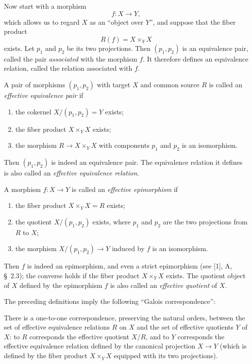 Now start with a morphism
\[
  f:X\longrightarrow Y,
\]
which allows us to regard $X$ as an ``object over $Y$'', and suppose that the
fiber product
\[
  R(f)=X\times_Y X
\]
exists. Let $p_1$ and $p_2$ be its two projections. Then $(p_1,p_2)$ is an
equivalence pair, called the pair \emph{associated} with the morphism $f$. It
therefore defines an equivalence relation, called the relation associated with
$f$.

A pair of morphisms $(p_1,p_2)$ with target $X$ and common source $R$ is
called an \emph{effective equivalence pair} if
\begin{enumerate}
  \item[(i)] the cokernel $X/(p_1,p_2)=Y$ exists;
  \item[(ii)] the fiber product $X\times_Y X$ exists;
  \item[(iii)] the morphism $R\longrightarrow X\times_Y X$ with components $p_1$
  and $p_2$ is an isomorphism.
\end{enumerate}
Then $(p_1,p_2)$ is indeed an equivalence pair. The equivalence relation it
defines is also called an \emph{effective equivalence relation}.

A morphism $f:X\longrightarrow Y$ is called an \emph{effective epimorphism}
if
\begin{enumerate}
  \item[(i)] the fiber product $X\times_Y X=R$ exists;
  \item[(ii)] the quotient $X/(p_1,p_2)$ exists, where $p_1$ and $p_2$ are the two
  projections from $R$ to $X$;
  \item[(iii)] the morphism $X/(p_1,p_2)\longrightarrow Y$ induced by $f$ is an
  isomorphism.
\end{enumerate}
Then $f$ is indeed an epimorphism, and even a strict epimorphism (see [1], A,
\S~2.3); the converse holds if the fiber product $X\times_Y X$ exists. The
quotient object of $X$ defined by the epimorphism $f$ is also called an
\emph{effective quotient} of $X$.

The preceding definitions imply the following ``Galois correspondence'':

 There is a one-to-one correspondence, preserving
the natural orders, between the set of effective equivalence relations $R$ on
$X$ and the set of effective quotients $Y$ of $X$: to $R$ corresponds the
effective quotient $X/R$, and to $Y$ corresponds the effective equivalence
relation defined by the canonical projection $X\longrightarrow Y$ (which is
defined by the fiber product $X\times_Y X$ equipped with its two projections).

